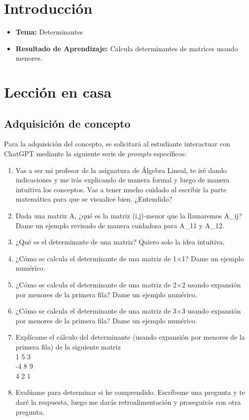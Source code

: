 \documentclass[a4,11pt]{aleph-notas}
\begin{document}
\encabezado


\section*{Introducción}

\begin{itemize}
    \item \textbf{Tema:} Determinantes
    \item \textbf{Resultado de Aprendizaje:} Calcula determinantes de matrices usando menores.
\end{itemize}

\section{Lección en casa}

\subsection{Adquisición de concepto}

Para la adquisición del concepto, se solicitará al estudiante interactuar con ChatGPT mediante la siguiente serie de \textit{prompts} específicos:

\begin{enumerate}[label=\textit{Prompt \arabic*.},leftmargin=2.1cm]
    \item Vas a ser mi profesor de la asignatura de Álgebra Lineal, te iré dando indicaciones y me irás explicando de manera formal y luego de manera intuitiva los conceptos. Vas a tener mucho cuidado al escribir la parte matemática para que se visualice bien. ¿Entendido?
    \item Dada una matriz A, ¿qué es la matriz (i,j)-menor que la llamaremos A\_ij? Dame un ejemplo revisado de manera cuidadosa para A\_11 y A\_12.
    \item ¿Qué es el determinante de una matriz? Quiero solo la idea intuitiva.
    \item ¿Cómo se calcula el determinante de una matriz de 1$\times$1? Dame un ejemplo numérico.
    \item ¿Cómo se calcula el determinante de una matriz de 2$\times$2 usando expansión por menores de la primera fila? Dame un ejemplo numérico.
    \item ¿Cómo se calcula el determinante de una matriz de 3$\times$3 usando expansión por menores de la primera fila? Dame un ejemplo numérico.
    \item Explícame el cálculo del determinante (usando expansión por menores de la primera fila) de la siguiente matriz\\
    1 5 3\\
    -4 8 9\\
    4 2 1
    \item Evalúame para determinar si he comprendido. Escríbeme una pregunta y te daré la respuesta, luego me darás retroalimentación y proseguirás con otra pregunta.
\end{enumerate}
\end{document}
